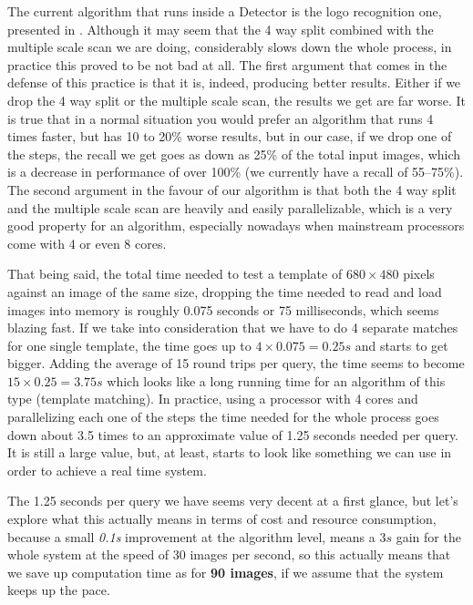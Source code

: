 The current algorithm that runs inside a Detector is the logo recognition one,
presented in . Although it may seem that
the 4 way split combined with the multiple scale scan we are doing,
considerably slows down the whole process, in practice this proved to be not
bad at all. The first argument that comes in the defense of this practice is
that it is, indeed, producing better results. Either if we drop the 4 way
split or the multiple scale scan, the results we get are far worse. It is true
that in a normal situation you would prefer an algorithm that runs 4 times
faster, but has 10 to 20\% worse results, but in our case, if we drop one of
the steps, the recall we get goes as down as 25\% of the total input images,
which is a decrease in performance of over 100\% (we currently have a recall
of 55--75\%). The second argument in the favour of our algorithm is that both the
4 way split and the multiple scale scan are heavily and easily parallelizable,
which is a very good property for an algorithm, especially nowadays when
mainstream processors come with 4 or even 8 cores.

That being said, the total time needed to test a template of \(680 \times 480\)
pixels against an image of the same size, dropping the time needed to read and
load images into memory is roughly 0.075 seconds or 75 milliseconds, which
seems blazing fast. If we take into consideration that we have to do 4
separate matches for one single template, the time goes up to \(4 \times 0.075
= 0.25 s\) and starts to get bigger. Adding the average of 15 round
trips per query, the time seems to become \(15 \times 0.25 = 3.75 s\)
which looks like a long running time for an algorithm of this type (template
matching). In practice, using a processor with 4 cores and parallelizing each
one of the steps the time needed for the whole process goes down about 3.5
times to an approximate value of 1.25 seconds needed per query. It is still a
large value, but, at least, starts to look like something we can use in order
to achieve a real time system.

The 1.25 seconds per query we have seems very decent at a first glance, but
let's explore what this actually means in terms of cost and resource
consumption, because a small \textit{0.1s} improvement at the algorithm level, means a
\(3s\) gain for the whole system at the speed of 30 images per second, so this
actually means that we save up computation time as for \textbf{90 images}, if
we assume that the system keeps up the pace.

